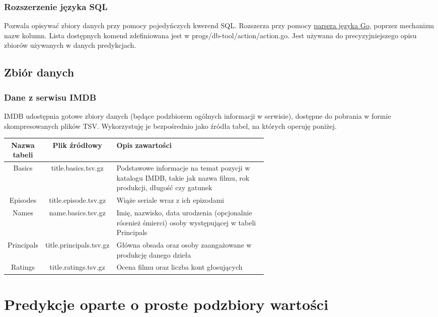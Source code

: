 \documentclass{article}
\begin{document}
\subsubsection{Rozszerzenie języka SQL}

Pozwala opisywać zbiory danych przy pomocy pojedyńczych kwerend SQL. Rozszerza przy pomocy \href{https://pkg.go.dev/go}{parsera języka Go}, poprzez mechanizm nazw kolumn. Lista dostępnych komend zdefiniowana jest w progs/db-tool/action/action.go. Jest używana do precyzyjniejszego opisu zbiorów używanych w danych predykcjach.

\subsection{Zbiór danych}

\subsubsection{Dane z serwisu IMDB}

IMDB udostępnia gotowe zbiory danych (będące podzbiorem ogólnych informacji w serwisie), dostępne do pobrania w formie skompresowanych plików TSV. Wykorzystuję je bezpośrednio jako źródła tabel, na których operuję poniżej.

\begin{center}
\begin{tabular}{ |c|c| p{0.6\linewidth} | }
	\hline
	\textbf{Nazwa tabeli} & \textbf{Plik źródłowy} & \textbf{Opis zawartości} \\ \hline
	Basics & title.basics.tsv.gz & Podstawowe informacje na temat pozycji w katalogu IMDB, takie jak nazwa filmu, rok produkcji, długość czy gatunek \\ \hline
	Episodes & title.episode.tsv.gz & Wiąże seriale wraz z ich epizodami \\ \hline
	Names & name.basics.tsv.gz & Imię, nazwisko, data urodzenia (opcjonalnie róœnież śmierci) osoby występującej w tabeli Principals \\ \hline
	Principals & title.principals.tsv.gz & Główna obsada oraz osoby zaangażowane w produkcję danego dzieła \\ \hline
	Ratings & title.ratings.tsv.gz & Ocena filmu oraz liczba kont głosujących \\ \hline
\end{tabular}
\end{center}

\pagebreak

\section{Predykcje oparte o proste podzbiory wartości}
\end{document}
